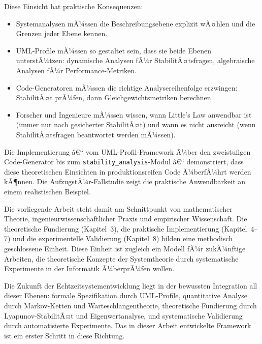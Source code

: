 ﻿\documentclass[a4paper,12pt]{scrreprt}
\theoremstyle{definition}
\begin{document}
Diese Einsicht hat praktische Konsequenzen:
\begin{itemize}
	\item[-] Systemanalysen mÃ¼ssen die Beschreibungsebene explizit wÃ¤hlen
	und die Grenzen jeder Ebene kennen.
	\item[-] UML-Profile mÃ¼ssen so gestaltet sein, dass sie beide Ebenen
	unterstÃ¼tzen: dynamische Analysen fÃ¼r StabilitÃ¤tsfragen,
	algebraische Analysen fÃ¼r Performance-Metriken.
	\item[-] Code-Generatoren mÃ¼ssen die richtige Analysereihenfolge
	erzwingen: StabilitÃ¤t prÃ¼fen, dann Gleichgewichtsmetriken
	berechnen.
	\item[-] Forscher und Ingenieure mÃ¼ssen wissen, wann Little's Law
	anwendbar ist (immer nur nach gesicherter StabilitÃ¤t) und
	wann es nicht ausreicht (wenn StabilitÃ¤tsfragen beantwortet
	werden mÃ¼ssen).
\end{itemize}

Die Implementierung â€“ vom UML-Profil-Framework Ã¼ber den zweistufigen
Code-Generator bis zum \texttt{stability\_analysis}-Modul â€“ demonstriert,
dass diese theoretischen Einsichten in produktionsreifen Code Ã¼berfÃ¼hrt
werden kÃ¶nnen.  Die AufzugstÃ¼r-Fallstudie zeigt die praktische
Anwendbarkeit an einem realistischen Beispiel.

Die vorliegende Arbeit steht damit am Schnittpunkt von mathematischer Theorie,
ingenieurwissenschaftlicher Praxis und empirischer Wissenschaft.  Die
theoretische Fundierung (Kapitel~3), die praktische Implementierung
(Kapitel~4--7) und die experimentelle Validierung (Kapitel~8) bilden eine
methodisch geschlossene Einheit.  Diese Einheit ist zugleich ein Modell
fÃ¼r zukÃ¼nftige Arbeiten, die theoretische Konzepte der Systemtheorie durch
systematische Experimente in der Informatik Ã¼berprÃ¼fen wollen.

Die Zukunft der Echtzeitsystementwicklung liegt in der bewussten Integration
all dieser Ebenen: formale Spezifikation durch UML-Profile, quantitative
Analyse durch Markov-Ketten und Warteschlangentheorie, theoretische Fundierung
durch Lyapunov-StabilitÃ¤t und Eigenwertanalyse, und systematische Validierung
durch automatisierte Experimente.  Das in dieser Arbeit entwickelte Framework
ist ein erster Schritt in diese Richtung.
\end{document}
